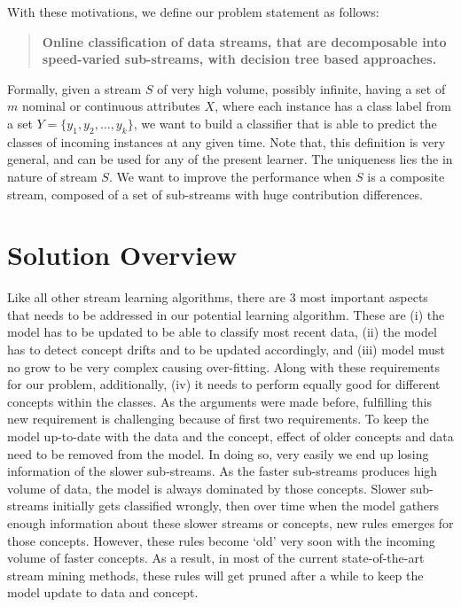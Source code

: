 With these motivations, we define our problem statement as follows:

\begin{quotation}
    \textbf{Online classification of data streams, that are decomposable into speed-varied sub-streams, with decision tree based approaches.}
\end{quotation}

\noindent Formally, given a stream $S$ of very high volume, possibly infinite, having a set of $m$ nominal or continuous attributes $X$, where each instance has a class label from a set $Y = \{y_1, y_2, \dots, y_k\}$, we want to build a classifier that is able to predict the classes of incoming instances at any given time. Note that, this definition is very general, and can be used for any of the present learner. The uniqueness lies the in nature of stream $S$. We want to improve the performance when $S$ is a composite stream, composed of a set of sub-streams with huge contribution differences.


\section{Solution Overview}
Like all other stream learning algorithms, there are 3 most important aspects that needs to be addressed in our potential learning algorithm. These are (i) the model has to be updated to be able to classify most recent data, (ii) the model has to detect concept drifts and to be updated accordingly, and (iii) model must no grow to be very complex causing over-fitting. Along with these requirements for our problem, additionally, (iv) it needs to perform equally good for different concepts within the classes. As the arguments were made before, fulfilling this new requirement is challenging because of first two requirements. To keep the model up-to-date with the data and the concept, effect of older concepts and data need to be removed from the model. In doing so, very easily we end up losing information of the slower sub-streams. As the faster sub-streams produces high volume of data, the model is always dominated by those concepts. Slower sub-streams initially gets classified wrongly, then over time when the model gathers enough information about these slower streams or concepts, new rules emerges for those concepts. However, these rules become `old' very soon with the incoming volume of faster concepts. As a result, in most of the current state-of-the-art stream mining methods, these rules will get pruned after a while to keep the model update to data and concept.

